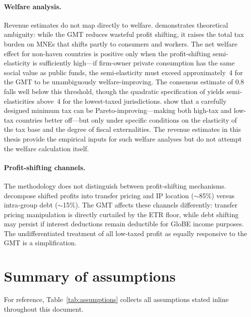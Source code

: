 \documentclass[11pt,a4paper]{article}
\begin{document}
\paragraph{Welfare analysis.} Revenue estimates do not map directly to welfare. \citet{Johannesen2022} demonstrates theoretical ambiguity: while the GMT reduces wasteful profit shifting, it raises the total tax burden on MNEs that shifts partly to consumers and workers. The net welfare effect for non-haven countries is positive only when the profit-shifting semi-elasticity is sufficiently high---if firm-owner private consumption has the same social value as public funds, the semi-elasticity must exceed approximately~4 for the GMT to be unambiguously welfare-improving. The consensus estimate of 0.8 falls well below this threshold, though the quadratic specification of \citet{dowd2017} yields semi-elasticities above~4 for the lowest-taxed jurisdictions. \citet{hebous2023} show that a carefully designed minimum tax can be Pareto-improving---making both high-tax and low-tax countries better off---but only under specific conditions on the elasticity of the tax base and the degree of fiscal externalities. The revenue estimates in this thesis provide the empirical inputs for such welfare analyses but do not attempt the welfare calculation itself.

\paragraph{Profit-shifting channels.} The methodology does not distinguish between profit-shifting mechanisms. \citet{torslov2022} decompose shifted profits into transfer pricing and IP location ($\sim$85\%) versus intra-group debt ($\sim$15\%). The GMT affects these channels differently: transfer pricing manipulation is directly curtailed by the ETR floor, while debt shifting may persist if interest deductions remain deductible for GloBE income purposes. The undifferentiated treatment of all low-taxed profit as equally responsive to the GMT is a simplification.

\section*{Summary of assumptions}\label{sec:assumptions_summary}

For reference, Table~\ref{tab:assumptions} collects all assumptions stated inline throughout this document.
\end{document}
